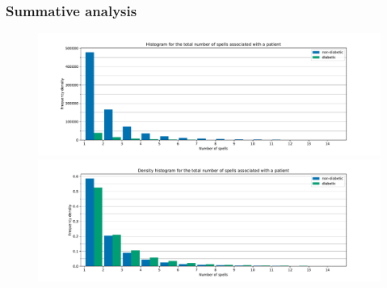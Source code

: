 \documentclass{beamer}
\begin{document}
\begin{frame}
    \frametitle{Summative analysis}

    \begin{figure}
        \begin{minipage}{\linewidth}
        \includegraphics[width=\linewidth]
            {./img/diabetic_no_spells_freq_hist.pdf}
        \end{minipage}
        \begin{minipage}{\linewidth}
        \includegraphics[width=\linewidth]
            {./img/diabetic_no_spells_density_hist.pdf}
        \end{minipage}
    \end{figure}
\end{frame}
\end{document}
